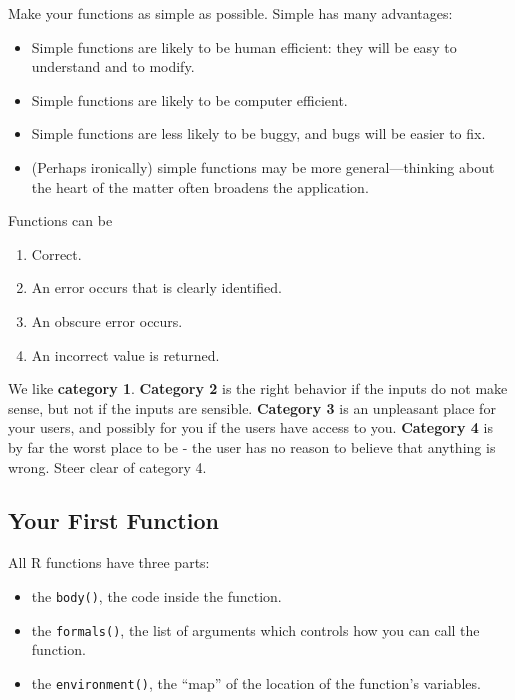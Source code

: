 \documentclass[]{book}
\providecommand{\tightlist}{%
  \setlength{\itemsep}{0pt}\setlength{\parskip}{0pt}}
\theoremstyle{definition}
\theoremstyle{definition}
\theoremstyle{definition}
\theoremstyle{remark}
\begin{document}
Make your functions as simple as possible. Simple has many advantages:

\begin{itemize}
\tightlist
\item
  Simple functions are likely to be human efficient: they will be easy
  to understand and to modify.
\item
  Simple functions are likely to be computer efficient.
\item
  Simple functions are less likely to be buggy, and bugs will be easier
  to fix.
\item
  (Perhaps ironically) simple functions may be more general---thinking
  about the heart of the matter often broadens the application.
\end{itemize}

Functions can be

\begin{enumerate}
\def\labelenumi{\arabic{enumi}.}
\tightlist
\item
  Correct.
\item
  An error occurs that is clearly identified.
\item
  An obscure error occurs.
\item
  An incorrect value is returned.
\end{enumerate}

We like \textbf{category 1}. \textbf{Category 2} is the right behavior
if the inputs do not make sense, but not if the inputs are sensible.
\textbf{Category 3} is an unpleasant place for your users, and possibly
for you if the users have access to you. \textbf{Category 4} is by far
the worst place to be - the user has no reason to believe that anything
is wrong. Steer clear of category 4.

\subsection{Your First Function}\label{your-first-function}

All R functions have three parts:

\begin{itemize}
\item
  the \texttt{body()}, the code inside the function.
\item
  the \texttt{formals()}, the list of arguments which controls how you
  can call the function.
\item
  the \texttt{environment()}, the ``map'' of the location of the
  function's variables.
\end{itemize}
\end{document}
